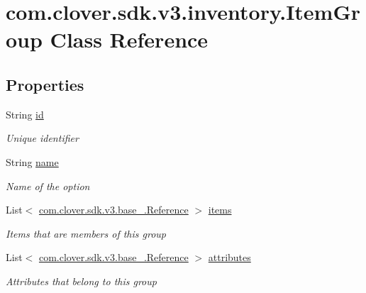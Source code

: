 \hypertarget{classcom_1_1clover_1_1sdk_1_1v3_1_1inventory_1_1_item_group}{}\section{com.\+clover.\+sdk.\+v3.\+inventory.\+Item\+Group Class Reference}
\label{classcom_1_1clover_1_1sdk_1_1v3_1_1inventory_1_1_item_group}
\subsection*{Properties}
\begin{DoxyCompactItemize}
\item 
String \hyperlink{classcom_1_1clover_1_1sdk_1_1v3_1_1inventory_1_1_item_group_aa739e0b18761eda22657b472a163aeeb}{id}
\begin{DoxyCompactList}\small\item\em Unique identifier \end{DoxyCompactList}\item 
String \hyperlink{classcom_1_1clover_1_1sdk_1_1v3_1_1inventory_1_1_item_group_a9495378b9548b9b145ccd7b1c527f464}{name}
\begin{DoxyCompactList}\small\item\em Name of the option \end{DoxyCompactList}\item 
List$<$ \hyperlink{classcom_1_1clover_1_1sdk_1_1v3_1_1base___1_1_reference}{com.\+clover.\+sdk.\+v3.\+base\+\_\+.\+Reference} $>$ \hyperlink{classcom_1_1clover_1_1sdk_1_1v3_1_1inventory_1_1_item_group_a35fe9229a8a5f6298790ac81c7c8ce76}{items}
\begin{DoxyCompactList}\small\item\em Items that are members of this group \end{DoxyCompactList}\item 
List$<$ \hyperlink{classcom_1_1clover_1_1sdk_1_1v3_1_1base___1_1_reference}{com.\+clover.\+sdk.\+v3.\+base\+\_\+.\+Reference} $>$ \hyperlink{classcom_1_1clover_1_1sdk_1_1v3_1_1inventory_1_1_item_group_a2dcf031351d77778ce43b559a63312f8}{attributes}
\begin{DoxyCompactList}\small\item\em Attributes that belong to this group \end{DoxyCompactList}\end{DoxyCompactItemize}


